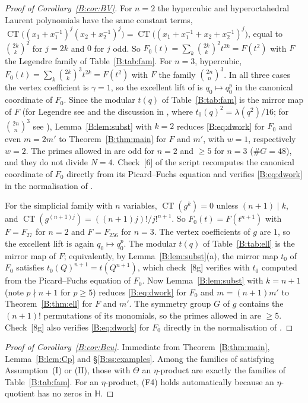 \documentclass[11pt,a4paper]{article}
\theoremstyle{definition}\newtheorem{definition}[theorem]{Definition}
\theoremstyle{remark}\newtheorem{remark}[theorem]{Remark}
\newcommand{\Hb}{\mathbb H}
\DeclareMathOperator{\CT}{CT}
\numberwithin{equation}{section}
\begin{document}
\begin{proof}[Proof of Corollary~\ref{B:cor:BV}]
For $n=2$ the hypercubic and hyperoctahedral Laurent polynomials have the same constant terms,
$\CT\bigl((x_1+x_1^{-1})^{j}(x_2+x_2^{-1})^{j}\bigr)=\CT\bigl((x_1+x_1^{-1}+x_2+x_2^{-1})^{j}\bigr)$,
equal to $\binom{2k}k^2$ for $j=2k$ and $0$ for $j$ odd. So
$F_0(t)=\sum_k\binom{2k}k^2t^{2k}=F(t^2)$ with $F$ the Legendre family of Table~\ref{B:tab:fam}. For
$n=3$, hypercubic, $F_0(t)=\sum_k\binom{2k}k^3t^{2k}=F(t^2)$ with $F$ the family $\binom{2n}n^3$. In all
three cases the vertex coefficient is $\gamma=1$, so the excellent lift of \cite[Def.~7.14]{BV3} is
$q_0\mapsto q_0^p$ in the canonical coordinate of $F_0$. Since the modular $t(q)$ of
Table~\ref{B:tab:fam} is the mirror map of $F$ (for Legendre see \cite[\S1]{Beu26} and the
discussion in \cite[\S8]{BV3}, where $t_0(q)^2=\lambda(q^2)/16$; for $\binom{2n}n^3$ see
\cite[App.~C, 9.1]{Beu26}), Lemma~\ref{B:lem:subst} with $k=2$ reduces \eqref{B:eq:dwork} for $F_0$ and
even $m=2m'$ to Theorem~\ref{B:thm:main} for $F$ and $m'$, with $w=1$, respectively $w=2$. The primes
allowed in \cite[Thm.~7.3]{BV3} are odd for $n=2$ and $\ge5$ for $n=3$ ($\#G=48$), and they do not
divide $N=4$. Check~[6] of the script recomputes the canonical coordinate of $F_0$ directly from
its Picard--Fuchs equation and verifies \eqref{B:eq:dwork} in the normalisation of \cite{BV3}.

For the simplicial family with $n$ variables, $\CT(g^k)=0$ unless $(n+1)\mid k$, and
$\CT(g^{(n+1)j})=((n+1)j)!/j!^{n+1}$. So $F_0(t)=F(t^{n+1})$ with $F=F_{27}$ for $n=2$ and $F=F_{256}$ for $n=3$. The vertex
coefficients of $g$ are $1$, so the excellent lift is again $q_0\mapsto q_0^p$. The modular $t(q)$ of Table~\ref{B:tab:ell} is the
mirror map of $F$; equivalently, by Lemma~\ref{B:lem:subst}(a), the mirror map $t_0$ of $F_0$ satisfies
$t_0(Q)^{n+1}=t(Q^{n+1})$, which check~[8g] verifies with $t_0$ computed from the Picard--Fuchs equation of $F_0$. Now
Lemma~\ref{B:lem:subst} with $k=n+1$ (note $p\nmid n+1$ for $p\ge5$) reduces \eqref{B:eq:dwork} for $F_0$ and $m=(n+1)m'$ to
Theorem~\ref{B:thm:ell} for $F$ and $m'$. The symmetry group $G$ of $g$ contains the $(n+1)!$ permutations of its monomials,
so the primes allowed in \cite[Thm.~7.3]{BV3} are $\ge5$. Check~[8g] also verifies \eqref{B:eq:dwork} for $F_0$ directly in
the normalisation of \cite{BV3}.
\end{proof}

\begin{proof}[Proof of Corollary~\ref{B:cor:Beu}]
Immediate from Theorem~\ref{B:thm:main}, Lemma~\ref{B:lem:Cp} and \S\ref{B:ss:examples}. Among the families
of \cite[App.~B, C]{Beu26} satisfying Assumption~(I) or (II), those with $\Theta$ an $\eta$-product
are exactly the families of Table~\ref{B:tab:fam}. For an $\eta$-product, (F4) holds automatically
because an $\eta$-quotient has no zeros in $\Hb$.
\end{proof}
\end{document}

